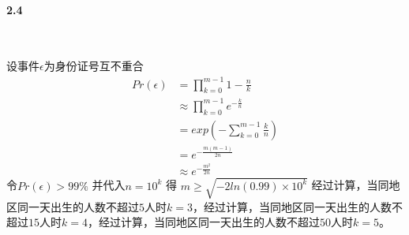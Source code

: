 \paragraph{2.4}~{}

设事件$\epsilon$为身份证号互不重合
$$
\begin{aligned}
    Pr(\epsilon) &= \prod_{k=0}^{m-1}{1-\frac{n}{k}}\\
    &\approx \prod_{k=0}^{m-1}{e^{-\frac{k}{n}}}\\
    &=exp(-\sum_{k=0}^{m-1}{\frac{k}{n}})\\
    &=e^{-\frac{m(m-1)}{2n}}\\
    &\approx e^{-\frac{m^2}{2n}}
\end{aligned}
$$
令$Pr(\epsilon) > 99\%$ 并代入$n=10^k$ 得 $m \ge \sqrt{-2ln(0.99)\times 10^k}$
经过计算，当同地区同一天出生的人数不超过$5$人时$k=3$，经过计算，当同地区同一天出生的人数不超过$15$人时$k=4$，经过计算，当同地区同一天出生的人数不超过$50$人时$k=5$。